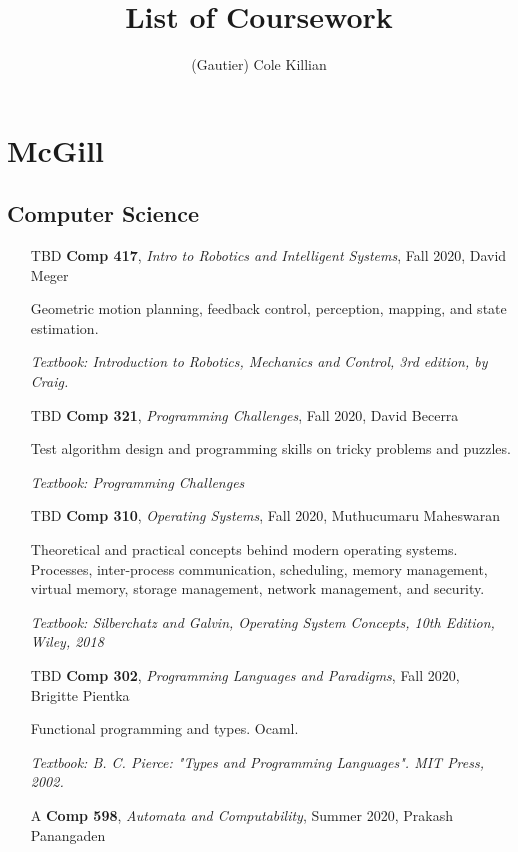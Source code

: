 \documentclass{scrartcl}
\title{List of Coursework}
\author{(Gautier) Cole Killian}
\begin{document}
\maketitle

\section*{McGill}

\subsection*{Computer Science}

\begin{itemize}
  \item[TBD] \textbf{Comp 417}, \textit{Intro to Robotics and Intelligent Systems},
    Fall 2020, David Meger

    Geometric motion planning, feedback control, perception, mapping, and state estimation.

    \textit{\small Textbook: Introduction to Robotics, Mechanics and Control, 3rd edition, by Craig.}

  \item[TBD] \textbf{Comp 321}, \textit{Programming Challenges},
    Fall 2020, David Becerra

    Test algorithm design and programming skills on tricky problems and puzzles.

    \textit{\small Textbook: Programming Challenges}

  \item[TBD] \textbf{Comp 310}, \textit{Operating Systems},
    Fall 2020, Muthucumaru Maheswaran

    Theoretical and practical concepts behind modern operating systems. Processes, inter-process communication, scheduling, memory management, virtual memory, storage management, network management, and security.

    \textit{\small Textbook: Silberchatz and Galvin, Operating System Concepts, 10th Edition, Wiley, 2018}

  \item[TBD] \textbf{Comp 302}, \textit{Programming Languages and Paradigms},
    Fall 2020, Brigitte Pientka 

    Functional programming and types. Ocaml.

    \textit{\small Textbook: B. C. Pierce: "Types and Programming Languages". MIT Press, 2002.}

  \item[A] \textbf{Comp 598}, \textit{Automata and Computability},
    Summer 2020, Prakash Panangaden


\end{itemize}
\end{document}
